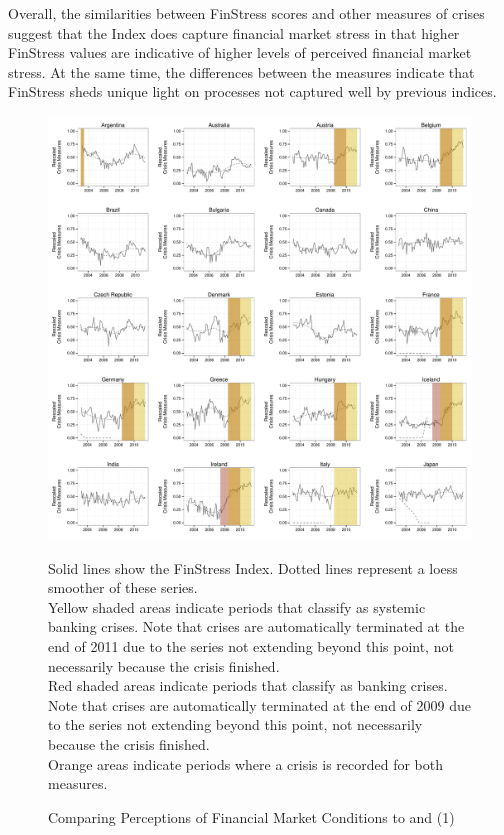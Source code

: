 \documentclass[]{article}
\begin{document}
Overall, the similarities between FinStress scores and other measures of crises suggest that the Index does capture financial market stress in that higher FinStress values are indicative of higher levels of perceived financial market stress. At the same time, the differences between the measures indicate that FinStress sheds unique light on processes not captured well by previous indices.

\begin{figure}
    \caption{Comparing Perceptions of Financial Market Conditions to \cite{laeven2013} and \cite{Reinhart2009} (1)}
    \label{compare_1}
    \begin{center}
        \includegraphics[scale=0.4]{figures/compare_to_lv_rr.pdf}
    \end{center}

    {\tiny{Solid lines show the FinStress Index. Dotted lines represent a loess smoother of these series. \\

    Yellow shaded areas indicate periods that \cite{laeven2013} classify as systemic banking crises. Note that crises are automatically terminated at the end of 2011 due to the series not extending beyond this point, not necessarily because the crisis finished. \\

    Red shaded areas indicate periods that \cite{Reinhart2009} classify as banking crises. Note that crises are automatically terminated at the end of 2009 due to the series not extending beyond this point, not necessarily because the crisis finished. \\

    Orange areas indicate periods where a crisis is recorded for both measures.}}
\end{figure}
\end{document}
